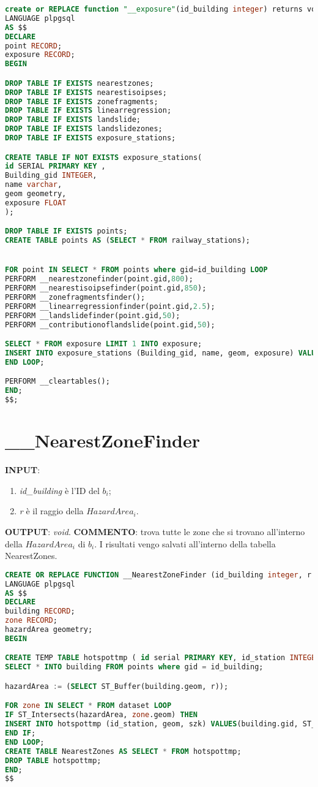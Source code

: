 \begin{lstlisting}[language=SQL]
create or REPLACE function "__exposure"(id_building integer) returns void
LANGUAGE plpgsql
AS $$
DECLARE
point RECORD;
exposure RECORD;
BEGIN

DROP TABLE IF EXISTS nearestzones;
DROP TABLE IF EXISTS nearestisoipses;
DROP TABLE IF EXISTS zonefragments;
DROP TABLE IF EXISTS linearregression;
DROP TABLE IF EXISTS landslide;
DROP TABLE IF EXISTS landslidezones;
DROP TABLE IF EXISTS exposure_stations;

CREATE TABLE IF NOT EXISTS exposure_stations(
id SERIAL PRIMARY KEY ,
Building_gid INTEGER,
name varchar,
geom geometry,
exposure FLOAT
);

DROP TABLE IF EXISTS points;
CREATE TABLE points AS (SELECT * FROM railway_stations);


FOR point IN SELECT * FROM points where gid=id_building LOOP
PERFORM __nearestzonefinder(point.gid,800);
PERFORM __nearestisoipsefinder(point.gid,850);
PERFORM __zonefragmentsfinder();
PERFORM __linearregressionfinder(point.gid,2.5);
PERFORM __landslidefinder(point.gid,50);
PERFORM __contributionoflandslide(point.gid,50);

SELECT * FROM exposure LIMIT 1 INTO exposure;
INSERT INTO exposure_stations (Building_gid, name, geom, exposure) VALUES (exposure.id, exposure.name, exposure.geom, exposure.exposure);
END LOOP;

PERFORM __cleartables();
END;
$$;
\end{lstlisting}

\section{\_\_NearestZoneFinder}
\textbf{INPUT}: 
\begin{enumerate}
	\item \textit{id\_building} è l'ID del $b_i$;
	\item \textit{r} è il raggio della $HazardArea_i$.
\end{enumerate}
\textbf{OUTPUT}: \textit{void}. \newline
\textbf{COMMENTO}: trova tutte le zone che si trovano all'interno della $HazardArea_i$ di $b_i$. I risultati vengo salvati all'interno della tabella NearestZones.

\begin{lstlisting}[language=SQL]
CREATE OR REPLACE FUNCTION __NearestZoneFinder (id_building integer, r integer) RETURNS void
LANGUAGE plpgsql
AS $$
DECLARE
building RECORD;
zone RECORD;
hazardArea geometry;
BEGIN

CREATE TEMP TABLE hotspottmp ( id serial PRIMARY KEY, id_station INTEGER, geom Geometry, szk FLOAT  ) ON COMMIT DROP;
SELECT * INTO building FROM points where gid = id_building;

hazardArea := (SELECT ST_Buffer(building.geom, r));

FOR zone IN SELECT * FROM dataset LOOP
IF ST_Intersects(hazardArea, zone.geom) THEN
INSERT INTO hotspottmp (id_station, geom, szk) VALUES(building.gid, ST_Intersection(hazardArea, zone.geom), zone.szk );
END IF;
END LOOP;
CREATE TABLE NearestZones AS SELECT * FROM hotspottmp;
DROP TABLE hotspottmp;
END;
$$
\end{lstlisting}

